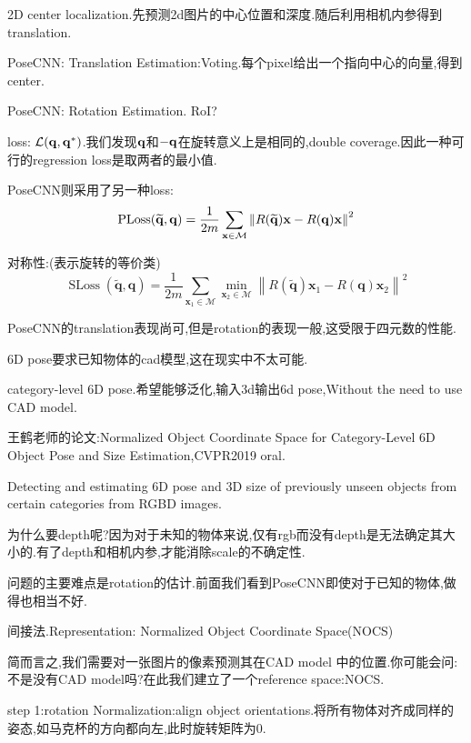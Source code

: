 	 2D center localization.先预测2d图片的中心位置和深度.随后利用相机内参得到translation.
	 
	 PoseCNN: Translation Estimation:Voting.每个pixel给出一个指向中心的向量,得到center.
	 
	PoseCNN: Rotation Estimation. RoI?
	
	loss: $\mathcal{L}(\bold{q}, \bold{q}^{*})$.我们发现$\bold{q}$和$-\bold{q}$在旋转意义上是相同的,double coverage.因此一种可行的regression loss是取两者的最小值.
	
	PoseCNN则采用了另一种loss:
	\begin{equation}
		\mathrm{PLoss}(\widetilde{\bold{q}}, \bold{q}) = \frac{1}{2m}\sum_{\bold{x} \in \mathcal{M}} \left \Vert R(\widetilde{\bold{q}}) \bold{x} - R(\bold{q}) \bold{x} \right \Vert^2
	\end{equation}

	对称性:(表示旋转的等价类)
	\begin{equation}
		\operatorname{SLoss}(\widetilde{\mathbf{q}}, \mathbf{q})=\frac{1}{2 m} \sum_{\mathbf{x}_{1} \in \mathcal{M}} \min _{\mathbf{x}_{2} \in \mathcal{M}}\left\|R(\tilde{\mathbf{q}}) \mathbf{x}_{1}-R(\mathbf{q}) \mathbf{x}_{2}\right\|^{2}
	\end{equation}

	PoseCNN的translation表现尚可,但是rotation的表现一般,这受限于四元数的性能.
	
	6D pose要求已知物体的cad模型,这在现实中不太可能.
	
	category-level 6D pose.希望能够泛化,输入3d输出6d pose,Without the need to use CAD model.
	
	王鹤老师的论文:Normalized Object Coordinate Space for Category-Level 6D Object Pose and Size Estimation,CVPR2019 oral.
	
	Detecting and estimating 6D pose and 3D size of previously unseen objects from certain categories from RGBD images.
	
	为什么要depth呢?因为对于未知的物体来说,仅有rgb而没有depth是无法确定其大小的.有了depth和相机内参,才能消除scale的不确定性.
	
	问题的主要难点是rotation的估计.前面我们看到PoseCNN即使对于已知的物体,做得也相当不好.
	
	间接法.Representation: Normalized Object Coordinate Space(NOCS)
	
	简而言之,我们需要对一张图片的像素预测其在CAD model 中的位置.你可能会问:不是没有CAD model吗?在此我们建立了一个reference space:NOCS.
	
	step 1:rotation Normalization:align object orientations.将所有物体对齐成同样的姿态,如马克杯的方向都向左,此时旋转矩阵为0.
	
